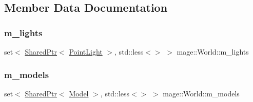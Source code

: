 \subsection{Member Data Documentation}
\hypertarget{classmage_1_1_world_acb9bceb4598a9d572f026cb65d850de5}{}\label{classmage_1_1_world_acb9bceb4598a9d572f026cb65d850de5} 
\subsubsection{\texorpdfstring{m\+\_\+lights}{m\_lights}}
{\footnotesize\ttfamily set$<$ \hyperlink{namespacemage_a1e01ae66713838a7a67d30e44c67703e}{Shared\+Ptr}$<$ \hyperlink{classmage_1_1_point_light}{Point\+Light} $>$, std\+::less$<$$>$ $>$ mage\+::\+World\+::m\+\_\+lights\hspace{0.3cm}{\ttfamily [private]}}

\hypertarget{classmage_1_1_world_ad2c8da43f7cc24ec9f3108d24ff3c144}{}\label{classmage_1_1_world_ad2c8da43f7cc24ec9f3108d24ff3c144} 
\subsubsection{\texorpdfstring{m\+\_\+models}{m\_models}}
{\footnotesize\ttfamily set$<$ \hyperlink{namespacemage_a1e01ae66713838a7a67d30e44c67703e}{Shared\+Ptr}$<$ \hyperlink{classmage_1_1_model}{Model} $>$, std\+::less$<$$>$ $>$ mage\+::\+World\+::m\+\_\+models\hspace{0.3cm}{\ttfamily [private]}}

